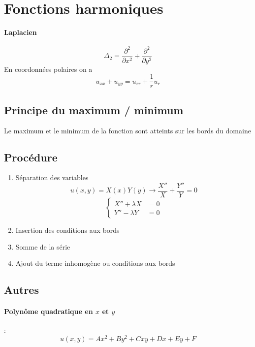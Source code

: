 \documentclass[resume]{subfiles}
\begin{document}
\section{Fonctions harmoniques}
\paragraph{Laplacien}
$$\Delta_2=\frac{\partial^2}{\partial x^2}+\frac{\partial^2}{\partial y^2}$$
En coordonnées polaires on a
$$u_{xx}+u_{yy}=u_{rr}+\frac{1}{r}u_r$$
\subsection{Principe du maximum / minimum}
Le maximum et le minimum de la fonction sont atteints sur les bords du domaine
\subsection{Procédure}
\begin{enumerate}
\item Séparation des variables
$$u(x,y)=X(x)Y(y)\longrightarrow \frac{X''}{X}+\frac{Y''}{Y}=0$$
$$\boxed{\begin{cases}X''+\lambda X&=0\\ Y''-\lambda Y&=0\end{cases}}$$

\item Insertion des conditions aux bords
\item Somme de la série
\item Ajout du terme inhomogène ou conditions aux bords
\end{enumerate}
\subsection{Autres}
\paragraph{Polynôme quadratique en $x$ et $y$} :
$$\boxed{u(x,y)=Ax^2+By^2+Cxy+Dx+Ey+F}$$
\end{document}
